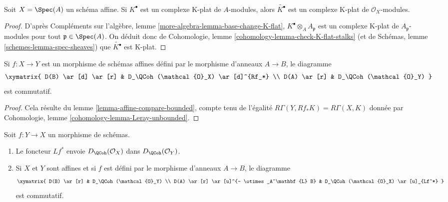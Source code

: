 \begin{lemma}
\label{lemma-affine-K-flat}
Soit $X = \Spec(A)$ un schéma affine. Si $K^\bullet$ est un complexe K-plat
de $A$-modules, alors $\widetilde{K^\bullet}$ est un complexe K-plat
de $\mathcal{O}_X$-modules.
\end{lemma}

\begin{proof}
D'après Compléments sur l'algèbre, lemme \ref{more-algebra-lemma-base-change-K-flat},
$K^\bullet \otimes_A A_\mathfrak p$ est un complexe K-plat
de $A_\mathfrak p$-modules pour tout $\mathfrak p \in \Spec(A)$.
On déduit donc de
Cohomologie, lemme \ref{cohomology-lemma-check-K-flat-stalks}
(et de
Schémas, lemme \ref{schemes-lemma-spec-sheaves})
que $\widetilde{K^\bullet}$ est K-plat.
\end{proof}

\begin{lemma}
\label{lemma-quasi-coherence-pushforward}
Si $f : X \to Y$ est un morphisme de schémas affines défini par le morphisme d'anneaux
$A \to B$, le diagramme
$$
\xymatrix{
D(B) \ar[d] \ar[r] & D_\QCoh(\mathcal{O}_X) \ar[d]^{Rf_*} \\
D(A) \ar[r] & D_\QCoh(\mathcal{O}_Y)
}
$$
est commutatif.
\end{lemma}

\begin{proof}
Cela résulte du lemme \ref{lemma-affine-compare-bounded},
compte tenu de l'égalité $R\Gamma(Y, Rf_*K) = R\Gamma(X, K)$ donnée par
Cohomologie, lemme \ref{cohomology-lemma-Leray-unbounded}.
\end{proof}

\begin{lemma}
\label{lemma-quasi-coherence-pullback}
Soit $f : Y \to X$ un morphisme de schémas.
\begin{enumerate}
\item Le foncteur $Lf^*$ envoie $D_\QCoh(\mathcal{O}_X)$
dans $D_\QCoh(\mathcal{O}_Y)$.
\item Si $X$ et $Y$ sont affines et si $f$ est défini par le morphisme d'anneaux
$A \to B$, le diagramme
$$
\xymatrix{
D(B) \ar[r] & D_\QCoh(\mathcal{O}_Y) \\
D(A) \ar[r] \ar[u]^{- \otimes_A^\mathbf{L} B} &
D_\QCoh(\mathcal{O}_X) \ar[u]_{Lf^*}
}
$$
est commutatif.
\end{enumerate}
\end{lemma}

